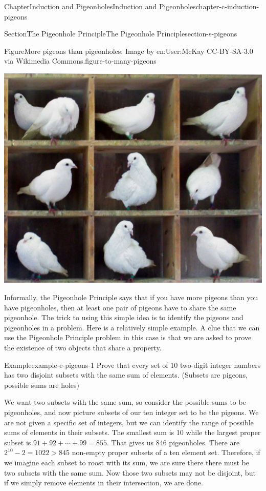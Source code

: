 \documentclass[oneside,10pt,]{book}
\numberwithin{equation}{section}
\begin{document}
\begin{chapterptx}{Chapter}{Induction and Pigeonholes}{}{Induction and Pigeonholes}{}{}{chapter-c-induction-pigeons}
\begin{sectionptx}{Section}{The Pigeonhole Principle}{}{The Pigeonhole Principle}{}{}{section-s-pigeons}
\begin{figureptx}{Figure}{More pigeons than pigeonholes.  Image by en:User:McKay CC-BY-SA-3.0 via Wikimedia Commons.}{figure-to-many-pigeons}{}%
\begin{image}{0}{1}{0}%
\includegraphics[width=\linewidth]{images/TooManyPigeons.jpg}
\end{image}%
\tcblower
\end{figureptx}%
Informally, the Pigeonhole Principle says that if you have more pigeons than you have pigeonholes, then at least one pair of pigeons have to share the same pigeonhole. The trick to using this simple idea is to identify the pigeons and pigeonholes in a problem.  Here is a relatively simple example. A clue that we can use the Pigeonhole Principle problem in this case is that we are asked to prove the existence of two objects that share a property.%
\begin{example}{Example}{}{example-e-pigeons-1}%
Prove that every set of 10 two-digit integer numbers has two disjoint subsets with the same sum of elements. (Subsets are pigeons, possible sums are holes)%
\par
We want two subsets with the same sum, so consider the possible sums to be pigeonholes, and now picture subsets of our ten integer set to be the pigeons. We are not given a specific set of integers, but we can identify the range of possible sums of elements in their subsets.  The smallest sum is 10 while the largest proper subset is \(91+92+\cdots+99 =855 \). That gives us 846 pigeonholes.  There are \(2^{10}-2 = 1022 > 845\) non-empty proper subsets of a ten element set.  Therefore, if we imagine each subset to roost with its sum, we are sure there there must be two subsets with the same sum.  Now those two subsets may not be disjoint, but if we simply remove elements in their intersection, we are done.%

\end{example}
\end{sectionptx}
\end{chapterptx}
\end{document}

